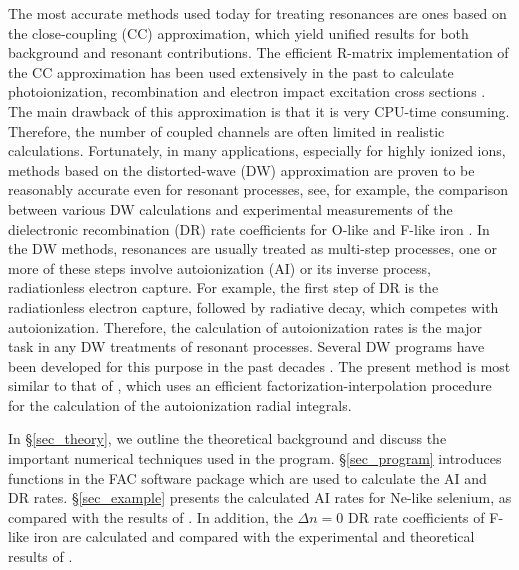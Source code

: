 \documentclass{elsart}
\begin{document}
The most accurate methods used today for treating resonances are ones based on
the close-coupling (CC) approximation, which yield unified results for both
background and resonant contributions. The efficient R-matrix implementation
of the CC approximation has been used extensively in the past to calculate
photoionization, recombination and electron impact excitation cross sections
\citep{hummer93, berrington95}. The main drawback of this approximation is
that it is very CPU-time consuming. Therefore, the number of coupled
channels are often limited in realistic calculations. Fortunately, in many
applications, especially for highly 
ionized ions, methods based on the distorted-wave (DW) approximation are
proven to be reasonably accurate even for resonant processes, see, for
example, the comparison between various DW calculations and experimental
measurements of the dielectronic recombination (DR) rate coefficients for
O-like and F-like iron \citep{savin99}. In the DW methods, resonances are
usually treated as 
multi-step processes, one or more of these steps involve autoionization (AI)
or its inverse process, radiationless
electron capture. For example, the first step of DR is the radiationless
electron capture, followed by radiative decay, which competes with
autoionization. Therefore, the calculation of autoionization rates is the
major task in any DW treatments of resonant processes. Several DW programs
have been developed for this purpose in the past decades \citep{pindzola80,
kim87, oreg91}. The present method is most similar to that of
\citet{oreg91}, which uses an efficient factorization-interpolation procedure
for the calculation of the autoionization radial integrals. 

In \S\ref{sec_theory}, we outline the theoretical background and discuss
the important numerical techniques used in the program. \S\ref{sec_program}
introduces functions in the FAC software package which are used to calculate
the AI and DR rates. \S\ref{sec_example} presents the calculated AI rates for
Ne-like selenium, as compared with the results of \citet{oreg91}. In addition,
the $\Delta n = 0$ DR rate coefficients of F-like iron are calculated and
compared with the experimental and theoretical results of \citet{savin99}. 
\end{document}
